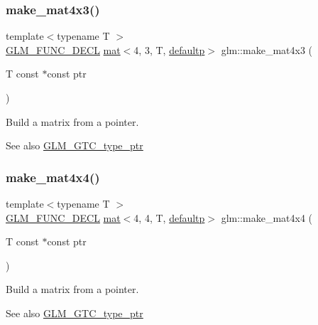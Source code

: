 \subsubsection{\texorpdfstring{make\+\_\+mat4x3()}{make\_mat4x3()}}
{\footnotesize\ttfamily template$<$typename T $>$ \\
\mbox{\hyperlink{setup_8hpp_ab2d052de21a70539923e9bcbf6e83a51}{G\+L\+M\+\_\+\+F\+U\+N\+C\+\_\+\+D\+E\+CL}} \mbox{\hyperlink{structglm_1_1mat}{mat}}$<$4, 3, T, \mbox{\hyperlink{namespaceglm_a36ed105b07c7746804d7fdc7cc90ff25a9d21ccd8b5a009ec7eb7677befc3bf51}{defaultp}}$>$ glm\+::make\+\_\+mat4x3 (\begin{DoxyParamCaption}\item[{T const $\ast$const}]{ptr }\end{DoxyParamCaption})}

Build a matrix from a pointer. \begin{DoxySeeAlso}{See also}
\mbox{\hyperlink{group__gtc__type__ptr}{G\+L\+M\+\_\+\+G\+T\+C\+\_\+type\+\_\+ptr}} 
\end{DoxySeeAlso}
\mbox{\label{group__gtc__type__ptr_ga8f084be30e404844bfbb4a551ac2728c}} 
\subsubsection{\texorpdfstring{make\+\_\+mat4x4()}{make\_mat4x4()}}
{\footnotesize\ttfamily template$<$typename T $>$ \\
\mbox{\hyperlink{setup_8hpp_ab2d052de21a70539923e9bcbf6e83a51}{G\+L\+M\+\_\+\+F\+U\+N\+C\+\_\+\+D\+E\+CL}} \mbox{\hyperlink{structglm_1_1mat}{mat}}$<$4, 4, T, \mbox{\hyperlink{namespaceglm_a36ed105b07c7746804d7fdc7cc90ff25a9d21ccd8b5a009ec7eb7677befc3bf51}{defaultp}}$>$ glm\+::make\+\_\+mat4x4 (\begin{DoxyParamCaption}\item[{T const $\ast$const}]{ptr }\end{DoxyParamCaption})}

Build a matrix from a pointer. \begin{DoxySeeAlso}{See also}
\mbox{\hyperlink{group__gtc__type__ptr}{G\+L\+M\+\_\+\+G\+T\+C\+\_\+type\+\_\+ptr}} 
\end{DoxySeeAlso}
\mbox{\label{group__gtc__type__ptr_gaadafb6600af2633e4c98cc64c72f5269}} 
